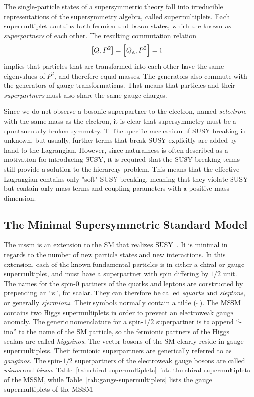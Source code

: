 The single-particle states of a supersymmetric theory fall into irreducible representations of the supersymmetry algebra, called supermultiplets. Each supermultiplet contains both fermion and boson states, which are known as \emph{superpartners} of each other. The resulting commutation relation
\begin{equation}
\comm{Q}{P^2}=\comm{Q^{\dagger}_{\dot{\alpha}}}{P^2}=0
\end{equation}
implies that particles that are transformed into each other have the same eigenvalues of $P^2$, and therefore equal masses. The generators also commute with the generators of gauge transformations. That means that particles and their \emph{superpartners} must also share the same gauge charges.

Since we do not observe a bosonic superpartner to the electron, named \emph{selectron}, with the same mass as the electron, it is clear that supersymmetry must be a spontaneously broken symmetry. T The specific mechanism of SUSY breaking is unknown, but usually, further terms that break SUSY explicitly are added by hand to the Lagrangian. However, since naturalness is often described as a motivation for introducing SUSY, it is required that the SUSY breaking terms still provide a solution to the hierarchy problem. This means that the effective Lagrangian contains only "soft" SUSY breaking, meaning that they violate SUSY but contain only mass terms and coupling parameters with a positive mass dimension.

\subsection{The Minimal Supersymmetric Standard Model}
\label{sec:MSSM}

The \gls{mssm} is an extension to the SM that realizes SUSY~\cite{MARTIN_1998}. It is minimal in regards to the number of new particle states and new interactions. In this extension, each of the known fundamental particles is in either a chiral or gauge supermultiplet, and must have a superpartner with spin differing by $1/2$ unit. The names for the spin-0 partners of the quarks and leptons are constructed by prepending an “s”, for scalar. They can therefore be called \emph{squarks} and \emph{sleptons}, or generally \emph{sfermions}. Their symbols normally contain a tilde ($\widetilde{\,\,\,}$). The MSSM contains two Higgs supermultiplets in order to prevent an electroweak gauge anomaly. The generic nomenclature for a spin-$1/2$ superpartner is to append “-ino” to the name of the SM particle, so the fermionic partners of the Higgs scalars are called \emph{higgsinos}. The vector bosons of the SM clearly reside in gauge supermultiplets. Their fermionic superpartners are generically referred to as \emph{gauginos}. The spin-$1/2$ superpartners of the electroweak gauge bosons are called \emph{winos} and \emph{binos}. Table~\ref{tab:chiral-supermultiplets} lists the chiral supermultiplets of the MSSM, while Table~\ref{tab:gauge-supermultiplets} lists the gauge supermultiplets of the MSSM.

